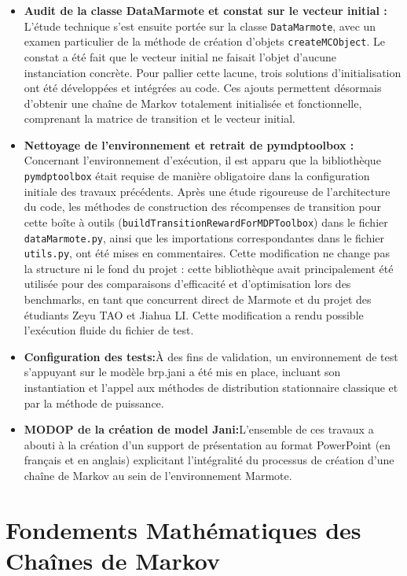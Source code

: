 \documentclass[14pt, a4paper]{extarticle}
\begin{document}
\begin{itemize}
  \item \textbf{Audit de la classe DataMarmote et constat sur le vecteur initial :} L'étude technique s'est ensuite portée sur la classe \texttt{DataMarmote}, avec un examen particulier de la méthode de création d'objets \texttt{createMCObject}. Le constat a été fait que le vecteur initial ne faisait l'objet d'aucune instanciation concrète. Pour pallier cette lacune, trois solutions d'initialisation ont été développées et intégrées au code. Ces ajouts permettent désormais d'obtenir une chaîne de Markov totalement initialisée et fonctionnelle, comprenant la matrice de transition et le vecteur initial.
  \item \textbf{Nettoyage de l'environnement et retrait de pymdptoolbox :} Concernant l'environnement d'exécution, il est apparu que la bibliothèque \texttt{pymdptoolbox} était requise de manière obligatoire dans la configuration initiale des travaux précédents. Après une étude rigoureuse de l'architecture du code, les méthodes de construction des récompenses de transition pour cette boîte à outils (\texttt{buildTransitionRewardForMDPToolbox}) dans le fichier \texttt{dataMarmote.py}, ainsi que les importations correspondantes dans le fichier \texttt{utils.py}, ont été mises en commentaires. Cette modification ne change pas la structure ni le fond du projet : cette bibliothèque avait principalement été utilisée pour des comparaisons d'efficacité et d'optimisation lors des benchmarks, en tant que concurrent direct de Marmote et du projet des étudiants Zeyu TAO et Jiahua LI. Cette modification a rendu possible l'exécution fluide du fichier de test.
  \item \textbf{Configuration des tests:}À des fins de validation, un environnement de test s'appuyant sur le modèle brp.jani a été mis en place, incluant son instantiation et l'appel aux méthodes de distribution stationnaire classique et par la méthode de puissance. 
  \item \textbf{MODOP de la création de model Jani:}L'ensemble de ces travaux a abouti à la création d'un support de présentation au format PowerPoint (en français et en anglais) explicitant l'intégralité du processus de création d'une chaîne de Markov au sein de l'environnement Marmote.
\end{itemize}

\section{Fondements Mathématiques des Chaînes de Markov}
\end{document}
